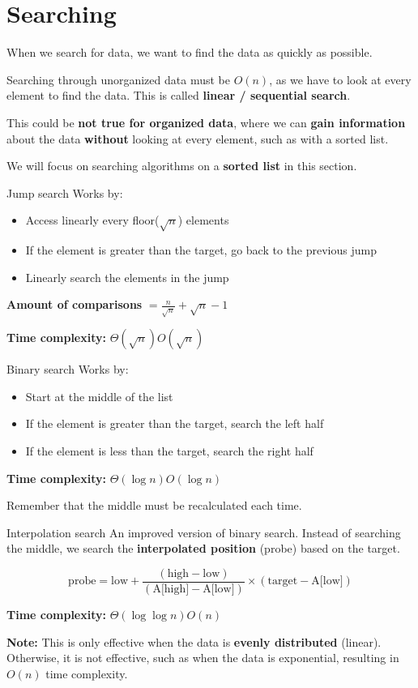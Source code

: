 \section{Searching}

When we search for data, we want to find the data as quickly as possible.

Searching through unorganized data must be $O(n)$, as we have to look at every element to find the data. This is called \textbf{linear / sequential search}.

This could be \textbf{not true for organized data}, where we can \textbf{gain information} about the data \textbf{without} looking at every element, such as with a sorted list.

We will focus on searching algorithms on a \textbf{sorted list} in this section.

\begin{definition}
    {Jump search}
    Works by:
    \begin{itemize}
        \item Access linearly every floor($\sqrt{n}$) elements
        \item If the element is greater than the target, go back to the previous jump
        \item Linearly search the elements in the jump
    \end{itemize}
    \textbf{Amount of comparisons} $=\frac{n}{\sqrt{n}} + \sqrt{n} - 1$

    \textbf{Time complexity:} $\Theta(\sqrt{n}) O(\sqrt{n})$
\end{definition}

\begin{definition}
    {Binary search}
    Works by:
    \begin{itemize}
        \item Start at the middle of the list
        \item If the element is greater than the target, search the left half
        \item If the element is less than the target, search the right half
    \end{itemize}

    \textbf{Time complexity:}  $\Theta(\log n) O(\log n)$

    Remember that the middle must be recalculated each time.
\end{definition}

\begin{theorem}
    {Interpolation search}
    An improved version of binary search. Instead of searching the middle, we search the \textbf{interpolated position} (probe) based on the target.

    \[ \text{probe} = \text{low} + \frac{(\text{high} - \text{low})}{(\text{A[high]} - \text{A[low]})} \times (\text{target} - \text{A[low]}) \]

    \textbf{Time complexity:} $\Theta(\log \log n) O(n)$

    \textbf{Note:} This is only effective when the data is \textbf{evenly distributed} (linear). Otherwise, it is not effective, such as when the data is exponential, resulting in $O(n)$ time complexity.
\end{theorem}

